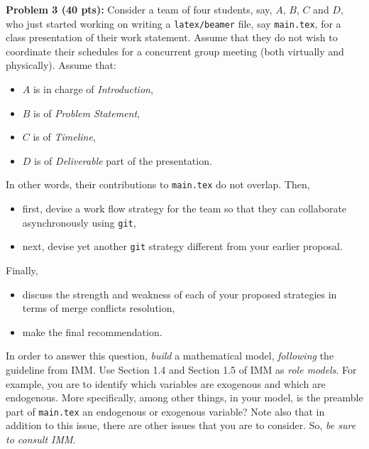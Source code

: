 \documentclass[12pt]{article}
\begin{document}
\newpage
\noindent\textbf{Problem 3 (40 pts):}
Consider a team of four students, say, $A$, $B$, $C$ and $D$, 
who just started working 
on writing a \texttt{latex/beamer} file, say \texttt{main.tex}, 
for a class presentation of their work statement.  
Assume that they do not wish to coordinate their schedules for a
concurrent group meeting (both virtually and physically).  
Assume that:
\begin{itemize}
\item $A$ is in charge of \emph{Introduction},
\item $B$ is of \emph{Problem Statement}, 
\item $C$ is of  \emph{Timeline},
\item $D$ is of \emph{Deliverable} part of the presentation.  
\end{itemize}
In other words, their contributions to \texttt{main.tex} do not overlap.
Then, 
\begin{itemize}
\item first, devise a work flow strategy for the team so that they can
  collaborate asynchronously using \texttt{git},
\item next, devise yet another \texttt{git} strategy different from your earlier
  proposal.  
\end{itemize}
Finally,
\begin{itemize}
\item discuss the strength and weakness of each of your proposed strategies in terms of merge
conflicts resolution,
\item make the final recommendation.  
\end{itemize}
In order to answer this question, \emph{build}
a mathematical model, \emph{following} the guideline from IMM. 
Use Section 1.4 and Section 1.5 of IMM as \emph{role models}.    
For example, you are to identify which variables  are exogenous 
and which are endogenous.  More specifically, among other things, 
in your model, is the preamble part of \texttt{main.tex} an endogenous 
or exogenous variable?  
Note also that in addition to this issue, there are other issues that
you are to consider.  So, \emph{be sure to consult IMM}. 
\end{document}
